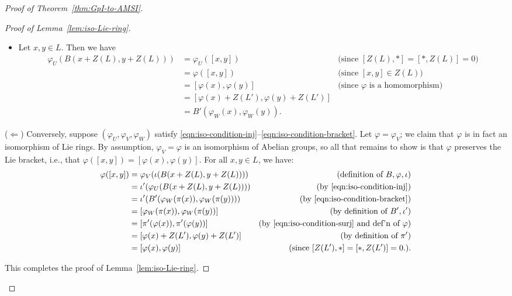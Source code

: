 \begin{proof}[Proof of Theorem~\ref{thm:GpI-to-AMSI}]
\begin{proof}[Proof of Lemma~\ref{lem:iso-Lie-ring}]
\begin{itemize}
\item[\ref{eqn:iso-condition-bracket}: ] Let $x,y \in L$.  Then we have
\begin{align*}
\varphi_U(B(x + Z(L),y + Z(L))) & = \varphi_U([x,y]) & \text{(since $[Z(L),*]=[*,Z(L)]=0$)} \\
 & = \varphi([x,y]) & \text{(since $[x,y] \in Z(L)$)} \\
 & = [\varphi(x), \varphi(y)] & \text{(since $\varphi$ is a homomorphism)}\\
 & = [\varphi(x) + Z(L'), \varphi(y) + Z(L')] \\
 &  = B'(\varphi_W(x), \varphi_W(y)).
\end{align*}

\end{itemize}

($\Leftarrow$) Conversely, suppose $(\varphi_U, \varphi_V, \varphi_W)$ satisfy \eqref{eqn:iso-condition-inj}--\eqref{eqn:iso-condition-bracket}. Let $\varphi = \varphi_V$; we claim that $\varphi$ is in fact an isomorphism of Lie rings. By assumption, $\varphi_V = \varphi$ is an isomorphism of Abelian groups, so all that remains to show is that $\varphi$ preserves the Lie bracket, i.e., that $\varphi([x,y]) = [\varphi(x), \varphi(y)]$. For all $x,y \in L$, we have:
\begin{align*}
\varphi([x,y]) & = \varphi_V(\iota(B(x + Z(L),y + Z(L)))) & \text{(definition of $B, \varphi, \iota$)}\\ 
 & = \iota'(\varphi_U(B(x + Z(L),y + Z(L)))) & \text{(by \eqref{eqn:iso-condition-inj})} \\
 & = \iota'(B'(\varphi_W(\pi(x)), \varphi_W(\pi(y)))) & \text{(by \eqref{eqn:iso-condition-bracket})} \\
 & = [\varphi_W(\pi(x)), \varphi_W(\pi(y))] & \text{(by definition of $B',\iota'$)} \\
 & = [\pi'(\varphi(x)), \pi'(\varphi(y))] & \text{(by \eqref{eqn:iso-condition-surj} and def'n of $\varphi$)} \\
 & = [\varphi(x) + Z(L'), \varphi(y) + Z(L')] & \text{(by definition of $\pi'$)} \\
 & = [\varphi(x), \varphi(y)] & \text{(since $[Z(L'),*] = [*, Z(L')] = 0$.)}.
\end{align*}

This completes the proof of Lemma~\ref{lem:iso-Lie-ring}.
\end{proof}



\end{proof}
